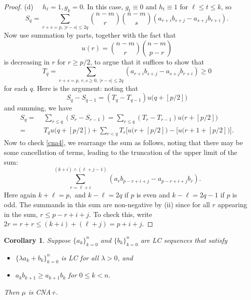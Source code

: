 \documentclass[10pt,reqno]{amsart}
\theoremstyle{plain}
\newtheorem{corollary}[theorem]{Corollary}
\theoremstyle{definition}
\theoremstyle{remark}
\begin{document}
\begin{proof}
(d) $\quad h_\ell=1, g_k=0$. In this case, $g_t\equiv 0$ and $h_t\equiv 1$ 
for  
$\ell\leq t\leq k$, so
$$S_q=\sum_{r+s=p,\,|r-s|\leq 2q}\binom {n-m}r\binom  {n-m}s(
a_{r+i}b_{s+j}-a_{s+j}b_{r+i}).$$
Now use summation by parts, together with the fact that
$$u(r)=\binom{n-m}r\binom{n-m}{p-r}$$
is decreasing in $r$ for $r\geq p/2$, to argue that it suffices to  show that
\begin{equation}\label{cna4}
T_q=\sum_{r+s=p,\,r,s\geq 0,\,|r-s|\leq 2q}(
a_{r+i}b_{s+j}-a_{s+j}b_{r+i})\geq 0
\end{equation}
for each $q$. Here is the argument: noting that
$$S_q-S_{q-1}=(T_q-T_{q-1})u\big(q+[p/2]\big)$$
and summing, we have
\begin{equation*}
\begin{split}
S_q=&\,\,\sum_{r\leq q}(S_r-S_{r-1})=\sum_{r\leq q}(T_r-T_{r-1})u 
\big(r+[p/2]\big)\\
=&\,\,T_qu\big(q+[p/2]\big)+\sum_{r<q}T_r\big[u\big(r+[p/2]\big)
-\big[u\big(r+1+[p/2]\big)\big].
\end{split}
\end{equation*}
Now to check \eqref{cna4}, we rearrange the sum as follows, 
noting  that there
may be some cancellation of terms, leading to the truncation of the  
upper limit
of the sum:
$$\sum_{r=\ell+i}^{(k+i)\wedge(\ell+j-1)}(a_rb_{p-r+i+j}-a_{p-r+i+j}b_r).$$
Here again $k+\ell=p,$ and $k-\ell=2q$ if $p$ is even and $k-\ell=2q-1$ if 
$p$  is odd. The summands in this sum are
non-negative by (ii) since for all $r$ appearing in the sum, $r\leq p-r +i+j$.
To check this, write $2r=r+r\leq (k+i)+(\ell+j)=p+i+j$.
\end{proof}

\begin{corollary}\label{cor-cna+}
Suppose $\{a_k\}_{k=0}^n$ and $\{b_k\}_{k=0}^n$ are LC sequences
that satisfy
\begin{itemize}
\item[(i)] $\{\lambda a_k+b_k\}_{k=0}^n$ is LC for all $\lambda>0$, and
\item[(ii)] $a_kb_{k+1}\geq a_{k+1}b_k$ for $0\leq k<n.$
\end{itemize}
Then $\mu$ is CNA+.
\end{corollary}
\end{document}
